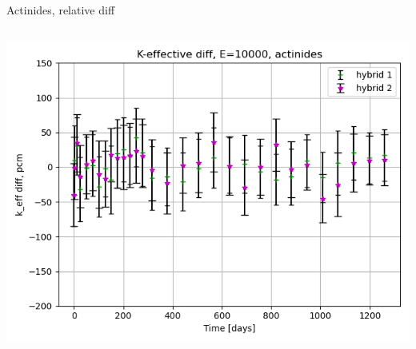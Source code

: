 \documentclass[
	11pt, %
	aspectratio=169, %
]{beamer}
\begin{document}
\begin{frame}{Actinides, relative diff}
\begin{columns}[c]
\begin{column}{0.39\textwidth}
			\includegraphics[width=\textwidth]{../figures/keff/keff_actinides_10000_diff.png}
		\end{column}
	\end{columns}
\end{frame}
\end{document}
